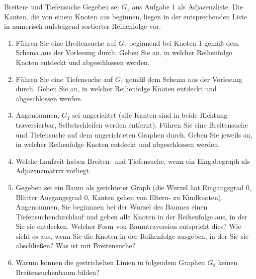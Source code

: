 \documentclass[11pt,a4paper]{article}
\begin{document}
\begin{aufgabe}{2}{Breiten- und Tiefensuche}
    Gegeben sei $G_1$ aus Aufgabe 1 als Adjazenzliste.
    Die Kanten, die von einem Knoten aus beginnen, liegen in der entsprechenden Liste in numerisch aufsteigend sortierter Reihenfolge vor.
    \begin{enumerate}
        \item Führen Sie eine Breitensuche auf $G_1$ beginnend bei Knoten 1 gemäß dem Schema aus der Vorlesung durch.
        Geben Sie an, in welcher Reihenfolge Knoten ent\-deckt und abgeschlossen werden.
        \item Führen Sie eine Tiefensuche auf $G_1$ gemäß dem Schema aus der Vorlesung durch.
        Geben Sie an, in welcher Reihenfolge Knoten entdeckt und abgeschlossen werden.
        \item Angenommen, $G_1$ sei ungerichtet (alle Kanten sind in beide Richtung traversierbar, Selbstschleifen werden entfernt).
        Führen Sie eine Breitensuche und Tiefensuche auf dem ungerichteten Graphen durch.
        Geben Sie jeweils an, in welcher Reihenfolge Knoten entdeckt und abgeschlossen werden.
        \item Welche Laufzeit haben Breiten- und Tiefensuche, wenn ein Eingabegraph als Adjazenzmatrix vorliegt.
        \item
        Gegeben sei ein Baum als gerichteter Graph (die Wurzel hat Eingangsgrad 0, Blätter Ausgangsgrad 0, Kanten gehen von Eltern- zu Kindknoten).
        Angenommen, Sie beginnnen bei der Wurzel des Baumes einen Tiefensuchendurchlauf und geben alle Knoten in der Reihenfolge aus, in der Sie sie entdecken.
        Welcher Form von Baumtraversion entspricht dies?
        Wie sieht es aus, wenn Sie die Knoten in der Reihenfolge ausgeben, in der Sie sie abschließen?
        Was ist mit Breitensuche?
        \item
        Warum können die gestrichelten Linien in folgendem Graphen $G_2$ keinen Breitensuchenbaum bilden?
        \begin{figure}[h!]
            \centering
\end{figure}
\end{enumerate}
\end{aufgabe}
\end{document}
